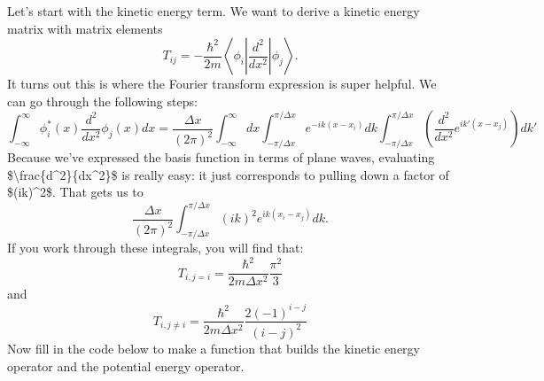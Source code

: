 \documentclass[letterpaper,10pt,english]{jupyterBook}
\begin{document}
\sphinxAtStartPar
Let’s start with the kinetic energy term. We want to derive a kinetic energy matrix with matrix elements
\label{equation:Section4_v2:6f40d1cc-3ad8-464c-ba4c-fce641c381b3}\begin{equation}
T_{ij} = -\frac{\hbar^2}{2m} \left \langle \phi_i \left\lvert \frac{d^2}{dx^2} \right\rvert \phi_j \right \rangle.
\end{equation}
\sphinxAtStartPar
It turns out this is where the Fourier transform expression is super helpful. We can go through the following steps:
\label{equation:Section4_v2:6bb1a75c-ba24-401f-9df8-2532aa94fc27}\begin{equation}
\int_{-\infty}^{\infty} \phi_i^\ast(x) \frac{d^2}{dx^2} \phi_j(x) dx = \frac{\Delta x}{(2\pi)^2} \int_{-\infty}^{\infty} dx \int_{-\pi/\Delta x}^{\pi/\Delta x} e^{-i k (x-x_i)} dk \int_{-\pi/\Delta x}^{\pi/\Delta x} \left( \frac{d^2}{dx^2} e^{i k' (x-x_j)} \right) dk'
\end{equation}
\sphinxAtStartPar
Because we’ve expressed the basis function in terms of plane waves, evaluating \$\textbackslash{}frac\{d\textasciicircum{}2\}\{dx\textasciicircum{}2\}\$ is really easy: it just corresponds to pulling down a factor of \$(ik)\textasciicircum{}2\$. That gets us to
\label{equation:Section4_v2:c5c0b553-b2b6-4d56-8447-496edaf1cedb}\begin{equation}
\frac{\Delta x}{(2\pi)^2} \int_{-\pi/\Delta x}^{\pi/\Delta x} (ik)^2 e^{i k (x_i - x_j)} dk.
\end{equation}
\sphinxAtStartPar
If you work through these integrals, you will find that:
\label{equation:Section4_v2:371fb54b-a84d-4430-b08e-9f79a175079a}\begin{equation}
\boxed{T_{i,j=i} = \frac{\hbar^2}{2m \Delta x^2} \frac{\pi^2}{3}}
\end{equation}
\sphinxAtStartPar
and
\label{equation:Section4_v2:ad71e8bf-aabd-451b-8263-27c9f56da31b}\begin{equation}
\boxed{T_{i,j \neq i} = \frac{\hbar^2}{2m \Delta x^2} \frac{2 (-1)^{i-j}}{(i-j)^2}}
\end{equation}
\sphinxAtStartPar
{} Now fill in the code below to make a function that builds the kinetic energy operator and the potential energy operator.
\end{document}
